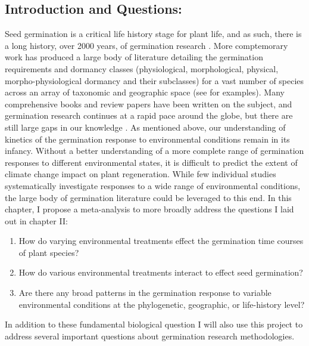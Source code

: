 \documentclass{article}\usepackage[]{graphicx}\usepackage[]{color}
\begin{document}
\subsection*{Introduction and Questions:}
\indent\indent Seed germination is a critical life history stage for plant life, and as such, there is a long history, over 2000 years, of germination research \citep{Baskin2014, Fenner2000}. More comptemorary work has produced a large body of literature detailing the germination requirements and dormancy classes (physiological, morphological, physical, morpho-physiological dormancy and their subclasses) for a vast number of species across an array of taxonomic and geographic space (see \citet{Baskin2014} for examples). Many comprehensive books and review papers have been written on the subject, and germination research continues at a rapid pace around the globe, but there are still large gaps in our knowledge \citep{Baskin2014}. As mentioned above, our understanding of  kinetics of the germination response to environmental conditions remain in its infancy.  Without a better understanding of a more complete range of germination responses to different environmental states, it is difficult to predict the extent of climate change impact on plant regeneration. While few individual studies systematically investigate responses to a wide range of environmental conditions, the large body of germination literature could be leveraged to this end. In this chapter, I propose a meta-analysis to more broadly address the questions I laid out in chapter II:
\begin{enumerate}
\item How do varying environmental treatments effect the germination time courses of plant species?
\item How do various environmental treatments interact to effect seed germination?
\item Are there any broad patterns in the germination response to variable environmental conditions at the phylogenetic, geographic, or life-history level?
\end{enumerate}
\indent\indent In addition to these fundamental biological question I will also use this project to address several important questions about germination research methodologies.
\end{document}

